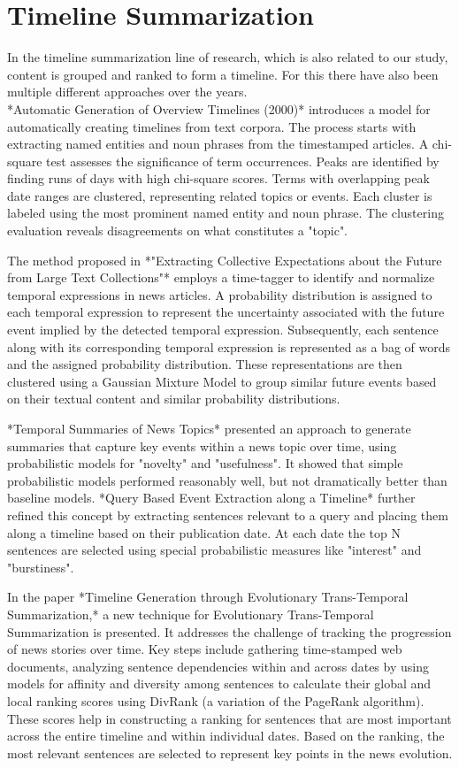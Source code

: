 \documentclass[a4paper,10pt]{report} %
\begin{document}
\section{Timeline Summarization}
In the timeline summarization line of research, which is also related to our study, content is grouped and ranked to form a timeline. For this there have also been multiple different approaches over the years. \\

*Automatic Generation of Overview Timelines (2000)* introduces a model for automatically creating timelines from text corpora. The process starts with extracting named entities and noun phrases from the timestamped articles. A chi-square test assesses the significance of term occurrences. Peaks are identified by finding runs of days with high chi-square scores. Terms with overlapping peak date ranges are clustered, representing related topics or events. Each cluster is labeled using the most prominent named entity and noun phrase. The clustering evaluation reveals disagreements on what constitutes a "topic".

The method proposed in *"Extracting Collective Expectations about the Future from Large Text Collections"* employs a time-tagger to identify and normalize temporal expressions in news articles. A probability distribution is assigned to each temporal expression to represent the uncertainty associated with the future event implied by the detected temporal expression. Subsequently, each sentence along with its corresponding temporal expression is represented as a bag of words and the assigned probability distribution. These representations are then clustered using a Gaussian Mixture Model to group similar future events based on their textual content and similar probability distributions.

*Temporal Summaries of News Topics* presented an approach to generate summaries that capture key events within a news topic over time, using probabilistic models for "novelty" and "usefulness". It showed that simple probabilistic models performed reasonably well, but not dramatically better than baseline models. *Query Based Event Extraction along a Timeline* further refined this concept by extracting sentences relevant to a query and placing them along a timeline based on their publication date. At each date the top N sentences are selected using special probabilistic measures like "interest" and "burstiness".

In the paper *Timeline Generation through Evolutionary Trans-Temporal Summarization,*  a new technique for Evolutionary Trans-Temporal Summarization is presented. It addresses the challenge of tracking the progression of news stories over time. Key steps include gathering time-stamped web documents, analyzing sentence dependencies within and across dates by using models for affinity and diversity among sentences to calculate their global and local ranking scores using DivRank (a variation of the PageRank algorithm). These scores help in constructing a ranking for sentences that are most important across the entire timeline and within individual dates. Based on the ranking, the most relevant sentences are selected to represent key points in the news evolution. \\
\end{document}
